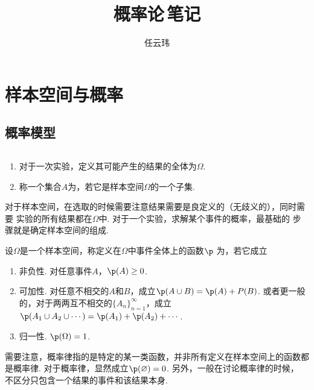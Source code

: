 

\title{概率论$\,$笔记}
\author{任云玮}
\date{}


\maketitle
\tableofcontents
\newpage

\section{样本空间与概率}

\subsection{概率模型}

  \begin{defi}
    $\,$
    \begin{enumerate}
      \item 对于一次实验，定义其可能产生的结果的全体为$\Omega$.
      \item 称一个集合$A$为，若它是样本空间$\Omega$的一个子集.
    \end{enumerate}
  \end{defi}
  \remark
    对于样本空间，在选取的时候需要注意结果需要是良定义的（无歧义的），同时需要
    实验的所有结果都在$\Omega$中. 对于一个实验，求解某个事件的概率，最基础的
    步骤就是确定样本空间的组成.

  \begin{defi}[概率律]
    \label{defi: 概率律}
    设$\Omega$是一个样本空间，称定义在$\Omega$中事件全体上的函数$\p$
    为，若它成立
    \begin{enumerate}
      \item 非负性. 对任意事件$A$，$\p(A)\ge 0$.
      \item 可加性. 对任意不相交的$A$和$B$，成立$\p(A\cup B)=\p(A)+P(B)$.
        或者更一般的，对于两两互不相交的$\{A_n\}_{n=1}^\infty$，成立
        $\p(A_1\cup A_2\cup\cdots) = \p(A_1) + \p(A_2) + \cdots$.
      \item 归一性. $\p(\Omega)=1$.
    \end{enumerate}
  \end{defi}
  \remark
    需要注意，概率律指的是特定的某一类函数，并非所有定义在样本空间上的函数都是概率律. 
    对于概率律，显然成立$\p(\varnothing) = 0$. 另外，一般在讨论概率律的时候，
    不区分只包含一个结果的事件和该结果本身.

